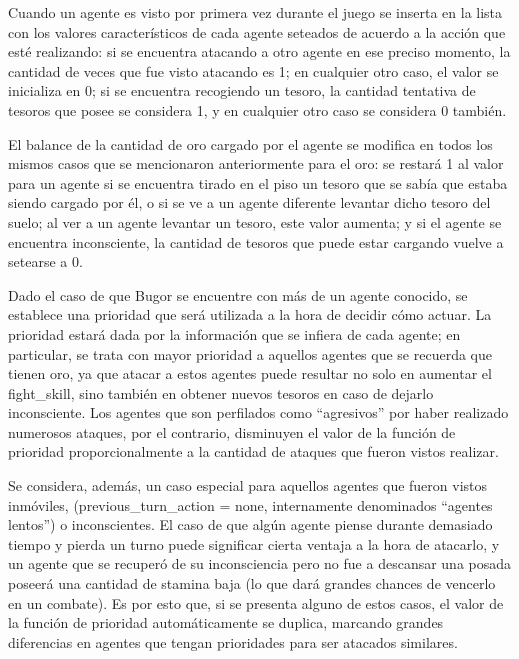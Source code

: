 \documentclass[a4paper,10pt,spanish]{article}
\begin{document}
	Cuando un agente es visto por primera vez durante el juego se inserta en la lista con los valores caracter\'isticos de cada agente seteados de acuerdo a la acci\'on que est\'e realizando: si se encuentra atacando a otro agente en ese preciso momento, la cantidad de veces que fue visto atacando es 1; en cualquier otro caso, el valor se inicializa en 0; si se encuentra recogiendo un tesoro, la cantidad tentativa de tesoros que posee se considera 1, y en cualquier otro caso se considera 0 tambi\'en.
	
	El balance de la cantidad de oro cargado por el agente se modifica en todos los mismos casos que se mencionaron anteriormente para el oro: se restar\'a 1 al valor para un agente si se encuentra tirado en el piso un tesoro que se sab\'ia que estaba siendo cargado por \'el, o si se ve a un agente diferente levantar dicho tesoro del suelo; al ver a un agente levantar un tesoro, este valor aumenta; y si el agente se encuentra inconsciente, la cantidad de tesoros que puede estar cargando vuelve a setearse a 0.
	
	Dado el caso de que Bugor se encuentre con m\'as de un agente conocido, se establece una prioridad que ser\'a utilizada a la hora de decidir c\'omo actuar. La prioridad estar\'a dada por la informaci\'on que se infiera de cada agente; en particular, se trata con mayor prioridad a aquellos agentes que se recuerda que tienen oro, ya que atacar a estos agentes puede resultar no solo en aumentar el fight\_skill, sino tambi\'en en obtener nuevos tesoros en caso de dejarlo inconsciente. Los agentes que son perfilados como ``agresivos'' por haber realizado numerosos ataques, por el contrario, disminuyen el valor de la funci\'on de prioridad proporcionalmente a la cantidad de ataques que fueron vistos realizar.
	
	Se considera, adem\'as, un caso especial para aquellos agentes que fueron vistos inm\'oviles, (previous\_turn\_action = none, internamente denominados ``agentes lentos'') o inconscientes. El caso de que alg\'un agente piense durante demasiado tiempo y pierda un turno puede significar cierta ventaja a la hora de atacarlo, y un agente que se recuper\'o de su inconsciencia pero no fue a descansar una posada poseer\'a una cantidad de stamina baja (lo que dar\'a grandes chances de vencerlo en un combate). Es por esto que, si se presenta alguno de estos casos, el valor de la funci\'on de prioridad autom\'aticamente se duplica, marcando grandes diferencias en agentes que tengan prioridades para ser atacados similares.
	
\end{document}
